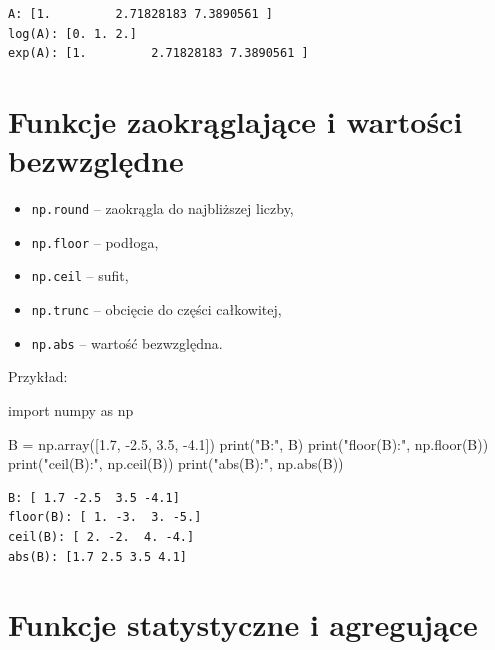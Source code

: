 \documentclass[
  polish,
  letterpaper,
  DIV=11,
  numbers=noendperiod]{scrreprt}
\newenvironment{Shaded}{\begin{snugshade}}{\end{snugshade}}
\newcommand{\BuiltInTok}[1]{\textcolor[rgb]{0.00,0.23,0.31}{#1}}
\newcommand{\FloatTok}[1]{\textcolor[rgb]{0.68,0.00,0.00}{#1}}
\newcommand{\ImportTok}[1]{\textcolor[rgb]{0.00,0.46,0.62}{#1}}
\newcommand{\NormalTok}[1]{\textcolor[rgb]{0.00,0.23,0.31}{#1}}
\newcommand{\OperatorTok}[1]{\textcolor[rgb]{0.37,0.37,0.37}{#1}}
\newcommand{\StringTok}[1]{\textcolor[rgb]{0.13,0.47,0.30}{#1}}
\providecommand{\tightlist}{%
  \setlength{\itemsep}{0pt}\setlength{\parskip}{0pt}}
\begin{document}
\begin{verbatim}
A: [1.         2.71828183 7.3890561 ]
log(A): [0. 1. 2.]
exp(A): [1.         2.71828183 7.3890561 ]
\end{verbatim}

\section{Funkcje zaokrąglające i wartości
bezwzględne}\label{funkcje-zaokrux105glajux105ce-i-wartoux15bci-bezwzglux119dne}

\begin{itemize}
\tightlist
\item
  \texttt{np.round} -- zaokrągla do najbliższej liczby,
\item
  \texttt{np.floor} -- podłoga,
\item
  \texttt{np.ceil} -- sufit,
\item
  \texttt{np.trunc} -- obcięcie do części całkowitej,
\item
  \texttt{np.abs} -- wartość bezwzględna.
\end{itemize}

Przykład:

\begin{Shaded}
\begin{Highlighting}[]
\ImportTok{import}\NormalTok{ numpy }\ImportTok{as}\NormalTok{ np}

\NormalTok{B }\OperatorTok{=}\NormalTok{ np.array([}\FloatTok{1.7}\NormalTok{, }\OperatorTok{{-}}\FloatTok{2.5}\NormalTok{, }\FloatTok{3.5}\NormalTok{, }\OperatorTok{{-}}\FloatTok{4.1}\NormalTok{])}
\BuiltInTok{print}\NormalTok{(}\StringTok{"B:"}\NormalTok{, B)}
\BuiltInTok{print}\NormalTok{(}\StringTok{"floor(B):"}\NormalTok{, np.floor(B))}
\BuiltInTok{print}\NormalTok{(}\StringTok{"ceil(B):"}\NormalTok{, np.ceil(B))}
\BuiltInTok{print}\NormalTok{(}\StringTok{"abs(B):"}\NormalTok{, np.}\BuiltInTok{abs}\NormalTok{(B))}
\end{Highlighting}
\end{Shaded}

\begin{verbatim}
B: [ 1.7 -2.5  3.5 -4.1]
floor(B): [ 1. -3.  3. -5.]
ceil(B): [ 2. -2.  4. -4.]
abs(B): [1.7 2.5 3.5 4.1]
\end{verbatim}

\section{Funkcje statystyczne i
agregujące}\label{funkcje-statystyczne-i-agregujux105ce}
\end{document}
